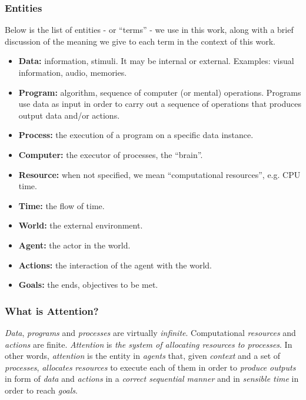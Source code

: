 \documentclass[12pt]{article}
\begin{document}
\subsubsection{Entities}
Below is the list of entities - or ``terms'' - we use in this work, along with a brief discussion of the meaning
we give to each term in the context of this work.

\begin{itemize}
    \item\textbf{Data:} information, stimuli. It may be internal or external. Examples: visual information, audio, memories.
    \item\textbf{Program:} algorithm, sequence of computer (or mental) operations. Programs use data as input in order to carry out a sequence of operations that produces output data and/or actions.
    \item\textbf{Process:} the execution of a program on a specific data instance.
    \item\textbf{Computer:} the executor of processes, the “brain”.
    \item\textbf{Resource:} when not specified, we mean “computational resources”, e.g. CPU time.
    \item\textbf{Time:} the flow of time.
    \item\textbf{World:} the external environment.
    \item\textbf{Agent:} the actor in the world.
    \item\textbf{Actions:} the interaction of the agent with the world.
    \item\textbf{Goals:} the ends, objectives to be met.
\end{itemize}

\subsubsection{What is Attention?}
\emph{Data}, \emph{programs} and \emph{processes} are virtually \emph{infinite}.
Computational \emph{resources} and \emph{actions} are finite.
\emph{Attention} is \emph{the system of allocating resources to processes}.
In other words, \emph{attention} is the entity in \emph{agents} that, given \emph{context} and a set of \emph{processes},
\emph{allocates} \emph{resources} to execute each of them in order to \emph{produce} \emph{outputs} in form of \emph{data} and \emph{actions} in a \emph{correct sequential manner} and in \emph{sensible time} in order to reach \emph{goals}.
\end{document}
